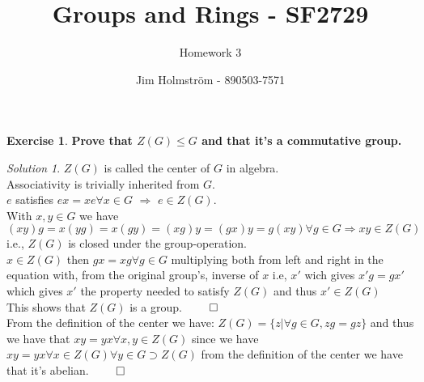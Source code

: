 \documentclass[a4paper,twoside=false,abstract=false,numbers=noenddot,
titlepage=false,headings=small,parskip=half,version=last]{scrartcl}
\author{Jim Holmström - 890503-7571}
\title{Groups and Rings - SF2729}
\subtitle{Homework 3}
\theoremstyle{definition}
\newtheorem{exercise}{Exercise}
\theoremstyle{remark}
\newtheorem*{solution}{Solution}
\newcommand{\GG}{\ensuremath{\mathcal{G}}}
\begin{document}
\maketitle
\thispagestyle{empty}

\begin{exercise}
{\bf
Prove that $Z(G) \leq G$ and that it's a commutative group.
}
\end{exercise}
\begin{solution}
$Z(G)$ is called the center of $G$ in algebra. \\

Associativity is trivially inherited from $G$.\\
$e$ satisfies $ex=xe \forall x \in G$ $\Rightarrow$ $e \in Z(G)$.\\
With $x,y \in G$ we have $(xy)g=x(yg)=x(gy)=(xg)y=(gx)y=g(xy) \forall g \in G \Rightarrow xy \in Z(G)$ i.e., $Z(G)$ is closed under the group-operation. \\  
$x \in Z(G)$ then $gx=xg \forall g \in G$ multiplying 
both from left and right in the equation with, from the original group's, inverse of 
$x$ i.e, $x'$ wich gives $x'g=gx'$ which gives $x'$ the property needed to satisfy $Z(G)$ and thus $x' \in Z(G)$ \\
This shows that $Z(G)$ is a group. $\qed$ \\

From the definition of the center we have:
$Z(G) = \{ z | \forall g \in G, zg=gz \}$ and thus we have that $xy=yx \forall x,y \in Z(G)$ 
since we have $xy=yx \forall x \in Z(G) \forall y \in G \supset Z(G)$ from the definition of the center we have that it's abelian. $\qed$

\end{solution}
\end{document}

